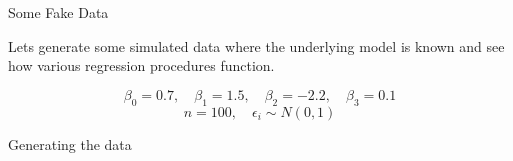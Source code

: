 \documentclass[11pt,ignorenonframetext,]{beamer}
\newenvironment{Shaded}{}{}
\newcommand{\DataTypeTok}[1]{\textcolor[rgb]{0.56,0.13,0.00}{#1}}
\newcommand{\DecValTok}[1]{\textcolor[rgb]{0.25,0.63,0.44}{#1}}
\newcommand{\FloatTok}[1]{\textcolor[rgb]{0.25,0.63,0.44}{#1}}
\newcommand{\KeywordTok}[1]{\textcolor[rgb]{0.00,0.44,0.13}{\textbf{#1}}}
\newcommand{\NormalTok}[1]{#1}
\newcommand{\OperatorTok}[1]{\textcolor[rgb]{0.40,0.40,0.40}{#1}}
\newcommand{\StringTok}[1]{\textcolor[rgb]{0.25,0.44,0.63}{#1}}
\let\oldShaded\Shaded
\let\endoldShaded\endShaded
\renewenvironment{Shaded}{\footnotesize\begin{spacing}{0.9}\oldShaded}{\endoldShaded\end{spacing}}
\begin{document}
\begin{frame}[t]{Some Fake Data}
\protect\hypertarget{some-fake-data}{}

Lets generate some simulated data where the underlying model is known
and see how various regression procedures function.

\[ \beta_0 = 0.7, \quad \beta_1 = 1.5, \quad \beta_2 = -2.2, \quad \beta_3 = 0.1 \]
\[ n=100, \quad \epsilon_i \sim N(0,1) \]

\end{frame}

\begin{frame}[fragile,t]{Generating the data}
\protect\hypertarget{generating-the-data}{}

\begin{Shaded}
\end{Shaded}

\end{frame}
\end{document}
